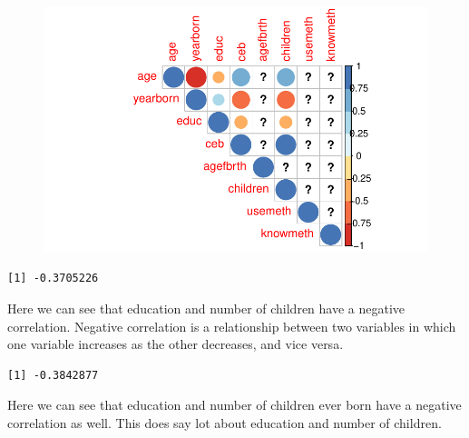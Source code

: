 \documentclass[
  letterpaper,
  DIV=11,
  numbers=noendperiod]{scrartcl}
\newenvironment{Shaded}{\begin{snugshade}}{\end{snugshade}}
\newcommand{\FunctionTok}[1]{\textcolor[rgb]{0.28,0.35,0.67}{#1}}
\newcommand{\NormalTok}[1]{\textcolor[rgb]{0.00,0.23,0.31}{#1}}
\newcommand{\SpecialCharTok}[1]{\textcolor[rgb]{0.37,0.37,0.37}{#1}}
\begin{document}
\begin{figure}[H]

{\centering \includegraphics{Fertility_Rates_Education_Impact_Botswana_files/figure-pdf/unnamed-chunk-32-1.pdf}

}

\end{figure}

\begin{Shaded}
\end{Shaded}

\begin{verbatim}
[1] -0.3705226
\end{verbatim}

Here we can see that education and number of children have a negative
correlation. Negative correlation is a relationship between two
variables in which one variable increases as the other decreases, and
vice versa.

\begin{Shaded}
\end{Shaded}

\begin{verbatim}
[1] -0.3842877
\end{verbatim}

Here we can see that education and number of children ever born have a
negative correlation as well. This does say lot about education and
number of children.
\end{document}
